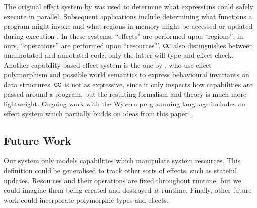 The original effect system by \cite{lucassen88} was used to determine what expressions could safely execute in parallel. Subsequent applications include determining what functions a program might invoke \cite{tang94} and what regions in memory might be accessed or updated during execution \cite{talpin94}. In these systems, ``effects'' are performed upon ``regions''; in ours, ``operations'' are performed upon ``resources'''. $\mathtt{CC}$ also distinguishes between unannotated and annotated code; only the latter will type-and-effect-check. Another capability-based effect system is the one by \cite{devriese16}, who use effect polymorphism and possible world semantics to express behavioural invariants on data structures. $\mathtt{CC}$ is not as expressive, since it only inspects how capabilities are passed around a program, but the resulting formalism and theory is much more
lightweight. Ongoing work with the Wyvern programming language includes an
effect system which partially builds on ideas from this paper \cite{melicher18effects}.

\subsection{Future Work}

Our system only models capabilities which manipulate system resources. This
definition could be generalised to track other sorts of effects, such as stateful
updates. Resources and their operations are fixed throughout
runtime, but we could imagine them being created and destroyed at runtime. 
Finally, other future work could incorporate polymorphic types and effects.
